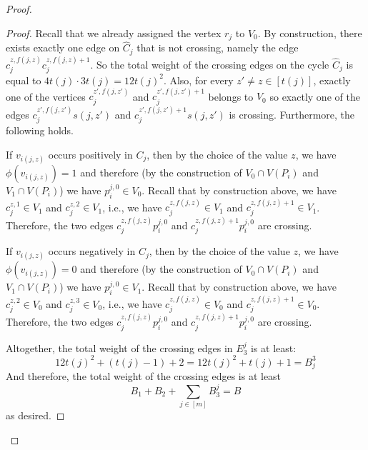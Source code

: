 \documentclass[a4paper,UKenglish,cleveref, autoref, thm-restate]{lipics-v2021}
\begin{document}
\begin{proof}
\begin{proof}
        Recall that we already assigned the vertex $r_j$ to $V_0$.
        By construction, there exists exactly one edge on $\hat C_j$ that is not crossing, namely the edge $c_j^{z, f(j,z)} c_j^{z, f(j,z) + 1}$.
        So the total weight of the crossing edges on the cycle $\hat C_j$ is equal to $4t(j) \cdot 3t(j) = 12t(j)^2$.
        Also, for every $z' \neq z \in [t(j)]$, exactly one of the vertices $c_j^{z', f(j,z')}$ and $c_j^{z', f(j,z') + 1}$ belongs to $V_0$ so exactly one of the edges $c_j^{z', f(j,z')} s(j,z')$ and $c_j^{z', f(j,z')+1} s(j,z')$ is crossing.
        Furthermore, the following holds.

        If $v_{i(j,z)}$ occurs positively in $C_j$, then by the choice of the value $z$, we have $\phi(v_{i(j,z)}) = 1$ and therefore (by the construction of $V_0 \cap V(P_i)$ and $V_1 \cap V(P_i)$) we have $p_i^{j,0} \in V_0$.
        Recall that by construction above, we have $c_j^{z,1} \in V_1$ and $c_j^{z,2} \in V_1$, i.e., we have $c_j^{z,f(j,z)} \in V_1$ and $c_j^{z,f(j,z)+1} \in V_1$.
        Therefore, the two edges $c_j^{z,f(j,z)} p_i^{j,0}$ and $c_j^{z,f(j,z)+1} p_i^{j,0}$ are crossing.

        If $v_{i(j,z)}$ occurs negatively in $C_j$, then by the choice of the value $z$, we have $\phi(v_{i(j,z)}) = 0$ and therefore (by the construction of $V_0 \cap V(P_i)$ and $V_1 \cap V(P_i)$) we have $p_i^{j,0} \in V_1$.
        Recall that by construction above, we have $c_j^{z,2} \in V_0$ and $c_j^{z,3} \in V_0$, i.e., we have $c_j^{z,f(j,z)} \in V_0$ and $c_j^{z,f(j,z)+1} \in V_0$.
        Therefore, the two edges $c_j^{z,f(j,z)} p_i^{j,0}$ and $c_j^{z,f(j,z)+1} p_i^{j,0}$ are crossing.
        
        Altogether, the total weight of the crossing edges in $E_3^j$ is at least:
        \[
            12t(j)^2 + (t(j) - 1) + 2 = 12t(j)^2 + t(j) + 1 = B_j^3
        \]
        And therefore, the total weight of the crossing edges is at least
        \[
            B_1 + B_2 + \sum_{j \in [m]} B_3^j = B
        \]
        as desired.
    \end{proof}


\end{proof}
\end{document}
